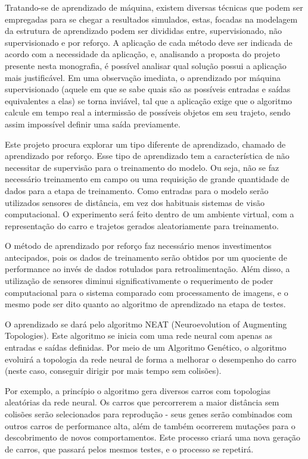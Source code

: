 Tratando-se de aprendizado de máquina, existem diversas técnicas que
podem ser empregadas para se chegar a resultados simulados, estas, focadas
na modelagem da estrutura de aprendizado podem ser divididas entre,
supervisionado, não supervisionado e por reforço. A aplicação de cada método
deve ser indicada de acordo com a necessidade da aplicação, e, analisando a
proposta do projeto presente nesta monografia, é possível analisar qual solução
possui a aplicação mais justificável. Em uma observação imediata, o
aprendizado por máquina supervisionado (aquele em que se sabe quais são as
possíveis entradas e saídas equivalentes a elas) se torna inviável, tal que a
aplicação exige que o algoritmo calcule em tempo real a intermissão de possíveis
objetos em seu trajeto, sendo assim impossível definir uma saída previamente.

Este projeto procura explorar um tipo diferente de aprendizado, chamado
de aprendizado por reforço. Esse tipo de aprendizado tem a característica de
não necessitar de supervisão para o treinamento do modelo. Ou seja, não se faz
necessário treinamento em campo ou uma requisição de grande quantidade de
dados para a etapa de treinamento. Como entradas para o modelo serão
utilizados sensores de distância, em vez dos habituais sistemas de visão
computacional. O experimento será feito dentro de um ambiente virtual, com a
representação do carro e trajetos gerados aleatoriamente para treinamento.

O método de aprendizado por reforço faz necessário menos investimentos
antecipados, pois os dados de treinamento serão obtidos por um quociente de
performance ao invés de dados rotulados para retroalimentação. Além disso, a
utilização de sensores diminui significativamente o requerimento de poder
computacional para o sistema comparado com processamento de imagens, e o
mesmo pode ser dito quanto ao algoritmo de aprendizado na etapa de testes.

O aprendizado se dará pelo algoritmo NEAT (Neuroevolution of
Augmenting Topologies). Este algoritmo se inicia com uma rede neural com
apenas as entradas e saídas definidas. Por meio de um Algoritmo Genético, o
algoritmo evoluirá a topologia da rede neural de forma a melhorar o desempenho
do carro (neste caso, conseguir dirigir por mais tempo sem colisões).

Por exemplo, a princípio o algoritmo gera diversos carros com topologias
aleatórias da rede neural. Os carros que percorrerem a maior distância sem
colisões serão selecionados para reprodução - seus genes serão combinados
com outros carros de performance alta, além de também ocorrerem mutações
para o descobrimento de novos comportamentos. Este processo criará uma nova
geração de carros, que passará pelos mesmos testes, e o processo se repetirá.

